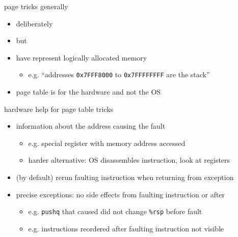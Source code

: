 \begin{frame}{page tricks generally}
\begin{itemize}
\item deliberately 
\item but 
\vspace{.5cm}
\item have  represent logically allocated memory
    \begin{itemize}
    \item e.g. ``addresses {\tt 0x7FFF8000} to {\tt 0x7FFFFFFFF} are the stack''
    \end{itemize}
\item page table is for the hardware and not the OS
\end{itemize}
\end{frame}

\begin{frame}{hardware help for page table tricks}
\begin{itemize}
\item information about the address causing the fault
    \begin{itemize}
    \item e.g. special register with memory address accessed
    \item harder alternative: OS disassembles instruction, look at registers
    \end{itemize}
\item (by default) rerun faulting instruction when returning from exception
\item precise exceptions: no side effects from faulting instruction or after
    \begin{itemize}
    \item e.g. {\tt pushq} that caused did not change {\tt \%rsp} before fault
    \item e.g. instructions reordered after faulting instruction not visible
    \end{itemize}
\end{itemize}
\end{frame}
